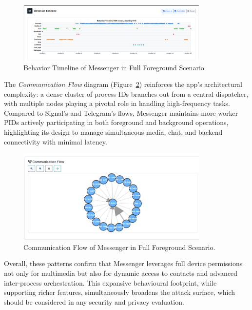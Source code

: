 \documentclass[a4paper,12pt]{report}
\begin{document}
\begin{figure}[H]
    \centering
    \includegraphics[width=0.85\textwidth]{messenger-full-behav.png}
    \caption{Behavior Timeline of Messenger in Full Foreground Scenario.}
    \label{fig:messenger-full-behav}
\end{figure}

The \textit{Communication Flow} diagram (Figure~\ref{fig:messenger-full-flow}) reinforces the app’s architectural complexity: a dense cluster of process IDs branches out from a central dispatcher, with multiple nodes playing a pivotal role in handling high-frequency tasks. Compared to Signal’s and Telegram’s flows, Messenger maintains more worker PIDs actively participating in both foreground and background operations, highlighting its design to manage simultaneous media, chat, and backend connectivity with minimal latency.

\begin{figure}[H]
    \centering
    \includegraphics[width=0.85\textwidth]{messenger-full-flow.png}
    \caption{Communication Flow of Messenger in Full Foreground Scenario.}
    \label{fig:messenger-full-flow}
\end{figure}

Overall, these patterns confirm that Messenger leverages full device permissions not only for multimedia but also for dynamic access to contacts and advanced inter-process orchestration. This expansive behavioural footprint, while supporting richer features, simultaneously broadens the attack surface, which should be considered in any security and privacy evaluation.
\end{document}
